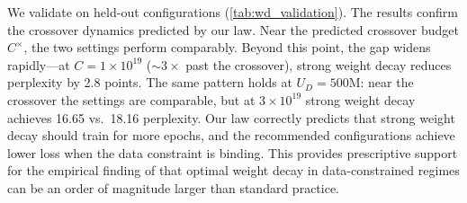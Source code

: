  We validate on held-out configurations (\autoref{tab:wd_validation}). The results confirm the crossover dynamics predicted by our law. Near the predicted crossover budget $C^{\times}$, the two settings perform comparably. Beyond this point, the gap widens rapidly---at $C = 1 \times 10^{19}$ (${\sim}3\times$ past the crossover), strong weight decay reduces perplexity by 2.8 points. The same pattern holds at $U_D = 500$M: near the crossover the settings are comparable, but at $3 \times 10^{19}$ strong weight decay achieves 16.65 vs.\ 18.16 perplexity. Our law correctly predicts that strong weight decay should train for more epochs, and the recommended configurations achieve lower loss when the data constraint is binding. This provides prescriptive support for the empirical finding of \citet{kim2026pretraining} that optimal weight decay in data-constrained regimes can be an order of magnitude larger than standard practice. 